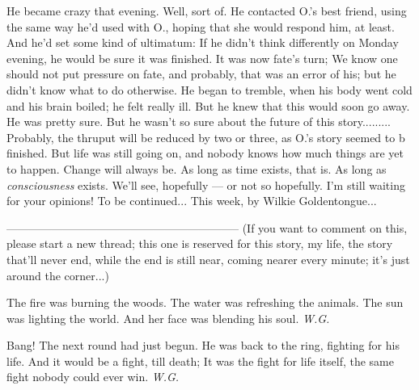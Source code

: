 He became crazy that evening. 
Well, sort of. 
He contacted O.'s best friend, using the same way he'd used with O., hoping that she would respond him, at least. 
And he'd set some kind of ultimatum: If he didn't think differently on Monday evening, he would be sure it was finished. It was now fate's turn; We know one should not put pressure on fate, and probably, that was an error of his; but he didn't know what to do otherwise. 
He began to tremble, when his body went cold and his brain boiled; he felt really ill. 
But he knew that this would soon go away. 
He was pretty sure. 
But he wasn't so sure about the future of this story.........
Probably, the thruput will be reduced by two or three, as O.'s story seemed to b finished. 
But life was still going on, and nobody knows how much things are yet to happen. 
Change will always be. 
As long as time exists, that is. 
As long as \emph{consciousness} exists. 
We'll see, hopefully --- or not so hopefully. 
I'm still waiting for your opinions!
To be continued...
This week, by Wilkie Goldentongue...

--------------------------------------------------------------
(If you want to comment on this, please start a new thread; this one is reserved for this story, my life, the story that'll never end, while the end is still near, coming nearer every minute; it's just around the corner...)

The fire was burning 
the woods. 
The water was refreshing 
the animals. 
The sun was lighting 
the world. 
And her face was blending 
his soul. 
\emph{W.G.}

Bang!
The next round had just begun. 
He was back to the ring, 
fighting for his life. 
And it would be a fight, 
till death; 
It was the fight 
for life itself, 
the same fight 
nobody could ever win. 
\emph{W.G.}
